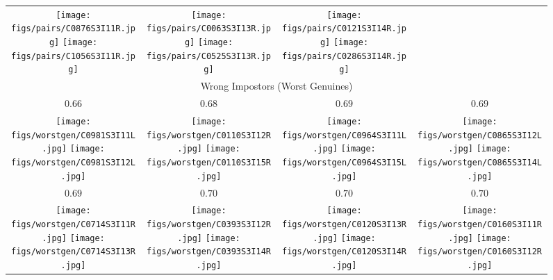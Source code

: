 \begin{figure}[!tb]
\begin{tabular}{cccc}
    {\texttt{[image: figs/pairs/C0876S3I11R.jpg]}}
    {\texttt{[image: figs/pairs/C1056S3I11R.jpg]}}&

    {\texttt{[image: figs/pairs/C0063S3I13R.jpg]}}
    {\texttt{[image: figs/pairs/C0525S3I13R.jpg]}}&
    
    {\texttt{[image: figs/pairs/C0121S3I14R.jpg]}}
    {\texttt{[image: figs/pairs/C0286S3I14R.jpg]}}\\[1.75ex] 
    
    \multicolumn{4}{c}{Wrong Impostors (Worst Genuines)} \\
    
    \scriptsize $0.66$ & \scriptsize $0.68$ & \scriptsize $0.69$ & \scriptsize $0.69$\\

    {\texttt{[image: figs/worstgen/C0981S3I11L.jpg]}}
    {\texttt{[image: figs/worstgen/C0981S3I12L.jpg]}}&

    {\texttt{[image: figs/worstgen/C0110S3I12R.jpg]}}
    {\texttt{[image: figs/worstgen/C0110S3I15R.jpg]}}&

    {\texttt{[image: figs/worstgen/C0964S3I11L.jpg]}}
    {\texttt{[image: figs/worstgen/C0964S3I15L.jpg]}}&
    
    {\texttt{[image: figs/worstgen/C0865S3I12L.jpg]}}
    {\texttt{[image: figs/worstgen/C0865S3I14L.jpg]}}\\

    \scriptsize $0.69$ & \scriptsize $0.70$ & \scriptsize $0.70$ & \scriptsize $0.70$\\

    {\texttt{[image: figs/worstgen/C0714S3I11R.jpg]}}
    {\texttt{[image: figs/worstgen/C0714S3I13R.jpg]}}&

    {\texttt{[image: figs/worstgen/C0393S3I12R.jpg]}}
    {\texttt{[image: figs/worstgen/C0393S3I14R.jpg]}}&

    {\texttt{[image: figs/worstgen/C0120S3I13R.jpg]}}
    {\texttt{[image: figs/worstgen/C0120S3I14R.jpg]}}&
    
    {\texttt{[image: figs/worstgen/C0160S3I11R.jpg]}}
    {\texttt{[image: figs/worstgen/C0160S3I12R.jpg]}}\\
    

\end{tabular}
\end{figure}
